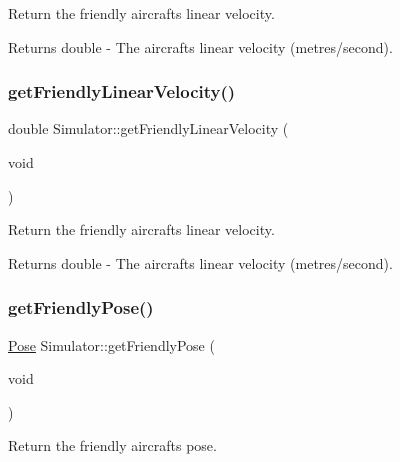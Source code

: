Return the friendly aircraft\textquotesingle{}s linear velocity. 

\begin{DoxyReturn}{Returns}
double -\/ The aircraft\textquotesingle{}s linear velocity (metres/second). 
\end{DoxyReturn}
\mbox{\label{classSimulator_a17d07e629ef87450d91d960c2e6b231e}} 
\subsubsection{\texorpdfstring{get\+Friendly\+Linear\+Velocity()}{getFriendlyLinearVelocity()}\hspace{0.1cm}{\footnotesize\ttfamily [2/2]}}
{\footnotesize\ttfamily double Simulator\+::get\+Friendly\+Linear\+Velocity (\begin{DoxyParamCaption}\item[{void}]{ }\end{DoxyParamCaption})}



Return the friendly aircraft\textquotesingle{}s linear velocity. 

\begin{DoxyReturn}{Returns}
double -\/ The aircraft\textquotesingle{}s linear velocity (metres/second). 
\end{DoxyReturn}
\mbox{\label{classSimulator_ab498029a37713969af417acfa7208d08}} 
\subsubsection{\texorpdfstring{get\+Friendly\+Pose()}{getFriendlyPose()}\hspace{0.1cm}{\footnotesize\ttfamily [1/2]}}
{\footnotesize\ttfamily \hyperlink{structPose}{Pose} Simulator\+::get\+Friendly\+Pose (\begin{DoxyParamCaption}\item[{void}]{ }\end{DoxyParamCaption})}



Return the friendly aircraft\textquotesingle{}s pose. 

